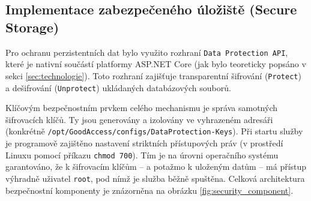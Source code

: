 \subsection{Implementace zabezpečeného úložiště (Secure Storage)}

Pro ochranu perzistentních dat bylo využito rozhraní \texttt{Data Protection API}, které je nativní součástí platformy ASP.NET Core (jak bylo teoreticky popsáno v sekci \ref{sec:technologie}). Toto rozhraní zajišťuje transparentní šifrování (\texttt{Protect}) a dešifrování (\texttt{Unprotect}) ukládaných databázových souborů.

Klíčovým bezpečnostním prvkem celého mechanismu je správa samotných šifrovacích klíčů. Ty jsou generovány a izolovány ve vyhrazeném adresáři (konkrétně \texttt{/opt/\allowbreak{}GoodAccess/\allowbreak{}configs/\allowbreak{}DataProtection-Keys}). Při startu služby je programově zajištěno nastavení striktních přístupových práv (v prostředí Linuxu pomocí příkazu \texttt{chmod 700}). Tím je na úrovni operačního systému garantováno, že k šifrovacím klíčům – a potažmo k uloženým datům – má přístup výhradně uživatel \texttt{root}, pod nímž je služba běžně spuštěna. Celková architektura bezpečnostní komponenty je znázorněna na obrázku \ref{fig:security_component}.

